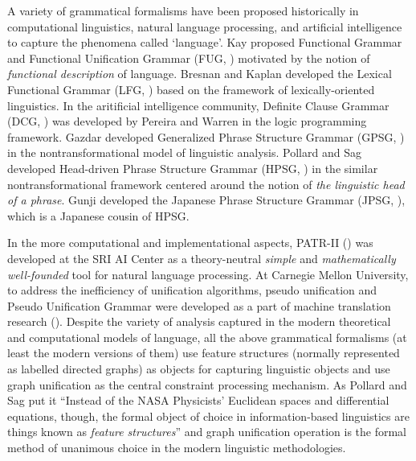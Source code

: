 A variety of grammatical formalisms have been proposed
historically in computational linguistics, natural language
processing, and artificial intelligence to capture the
phenomena called `language'.  Kay proposed Functional
Grammar and Functional Unification Grammar (FUG,
\cite{FUG}) motivated by the notion of {\it functional description} of
language.  Bresnan and Kaplan developed the Lexical Functional Grammar
(LFG, \cite{LFG}) based on the framework of lexically-oriented
linguistics. In the aritificial intelligence community, Definite
Clause Grammar (DCG, \cite{DCG}) was developed by Pereira and Warren
in the logic programming framework. 
 Gazdar developed
Generalized Phrase Structure Grammar (GPSG, \cite{GPSG}) in the
nontransformational model of linguistic analysis.  Pollard and Sag
developed Head-driven Phrase Structure Grammar (HPSG, \cite{HPSG}) in
the similar nontransformational framework centered around the notion
of {\it the linguistic head of a phrase}.  Gunji developed the
Japanese Phrase Structure Grammar (JPSG, \cite{JPSG}), which is a 
Japanese cousin of HPSG. 


In the more computational and implementational aspects,
PATR-II (\cite{PATR-II}) was developed at the SRI AI Center
as a theory-neutral {\it simple} and {\it mathematically
well-founded} tool for natural language processing. At
Carnegie Mellon University, to address the inefficiency of
unification algorithms, pseudo unification and Pseudo
Unification Grammar were developed as a part of machine
translation research (\cite{Pseudo}).
Despite the variety of analysis captured in the modern theoretical and
computational models of language, 
all the above grammatical formalisms (at least the modern versions of
them) use feature structures (normally represented as labelled
directed graphs) as objects for
capturing linguistic objects and use
graph unification as the central constraint processing mechanism. 
As Pollard and Sag put it ``Instead of the NASA Physicists' Euclidean
spaces and differential equations, though, the formal object of choice
in information-based linguistics are things known as {\it feature
structures}'' and graph unification operation is the formal method of
unanimous choice in the modern linguistic methodologies. 

